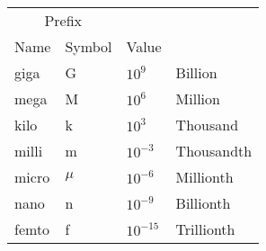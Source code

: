 \begin{tabular}{llll}
\hline
\multicolumn{2}{c}{Prefix}  & & 			 \\
Name    & Symbol & Value  	  &				 \\
\hline
giga	& G 	 & $10^9$	  & Billion 	 \\
mega    & M      & $10^6$     & Million      \\
kilo    & k      & $10^3$     & Thousand     \\
milli   & m      & $10^{-3}$  & Thousandth   \\
micro   & $\mu$  & $10^{-6}$  & Millionth    \\
nano    & n      & $10^{-9}$  & Billionth    \\
femto   & f      & $10^{-15}$ & Trillionth   \\
\hline
\end{tabular}